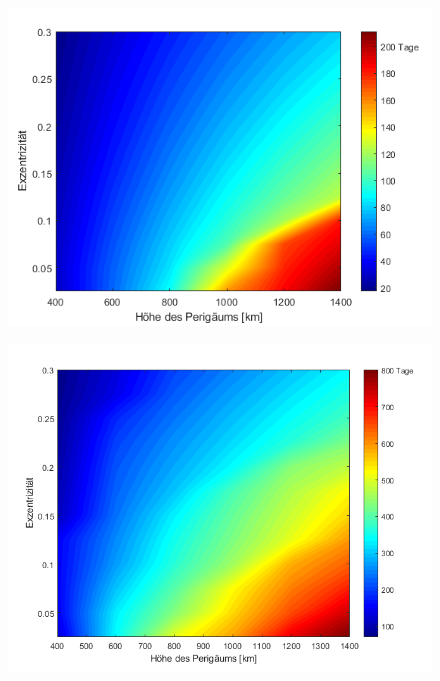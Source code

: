 \begin{figure}[h]
	\centering
		\includegraphics[width=1.00\textwidth]{./graphics/GMAT/ecc_perigee_50kg.png}
	\label{fig:GMAT_ecc_50}
\end{figure}

\begin{figure}[h]
	\centering
		\includegraphics[width=1.00\textwidth]{./graphics/GMAT/ecc_perigee_375kg.png}
	\label{fig:GMAT_ecc_375}
\end{figure}

